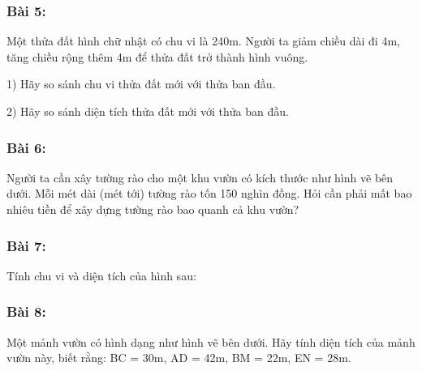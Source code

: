 \documentclass[11pt]{article}
\begin{document}
\subsubsection*{Bài 5:} Một thửa đất hình chữ nhật có chu vi là 240m. Người ta giảm chiều dài đi 4m, tăng chiều rộng thêm 4m để thửa đất trở thành hình vuông.

1) Hãy so sánh chu vi thửa đất mới với thửa ban đầu.

2) Hãy so sánh diện tích thửa đất mới với thửa ban đầu.

\subsubsection*{Bài 6:} Người ta cần xây tường rào cho một khu vườn có kích thước như hình vẽ bên dưới. Mỗi mét dài (mét tới) tường rào tốn 150 nghìn đồng. Hỏi cần phải mất bao nhiêu tiền để xây dựng tường rào bao quanh cả khu vườn?

\subsubsection*{Bài 7:} Tính chu vi và diện tích của hình sau:

\begin{center}
\end{center}

\subsubsection*{Bài 8:} Một mảnh vườn có hình dạng như hình vẽ bên dưới. Hãy tính diện tích của mảnh vườn này, biết rằng: BC = 30m, AD = 42m, BM = 22m, EN = 28m.
\end{document}
